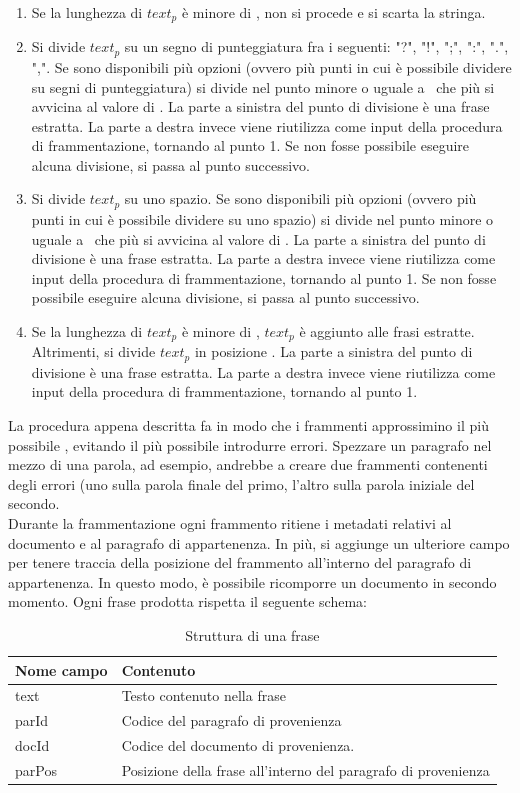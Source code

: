 \begin{enumerate}
\item Se la lunghezza di $text_p$ è minore di \lmin, non si procede e si scarta la stringa.
\item Si divide $text_p$ su un segno di punteggiatura fra i seguenti: "?", "!", ";", ":", ".", ",". Se sono disponibili più opzioni (ovvero più punti in cui è possibile dividere su segni di punteggiatura) si divide nel punto minore o uguale a \lmax\ che più si avvicina al valore di \lmax. La parte a sinistra del punto di divisione è una frase estratta. La parte a destra invece viene riutilizza come input della procedura di frammentazione, tornando al punto 1. Se non fosse possibile eseguire alcuna divisione, si passa al punto successivo.
\item Si divide $text_p$ su uno spazio. Se sono disponibili più opzioni (ovvero più punti in cui è possibile dividere su uno spazio) si divide nel punto minore o uguale a \lmax\ che più si avvicina al valore di \lmax. La parte a sinistra del punto di divisione è una frase estratta. La parte a destra invece viene riutilizza come input della procedura di frammentazione, tornando al punto 1. Se non fosse possibile eseguire alcuna divisione, si passa al punto successivo.
\item Se la lunghezza di $text_p$ è minore di \lmax, $text_p$ è aggiunto alle frasi estratte. Altrimenti, si divide $text_p$ in posizione \lmax. La parte a sinistra del punto di divisione è una frase estratta. La parte a destra invece viene riutilizza come input della procedura di frammentazione, tornando al punto 1. 
\end{enumerate}

La procedura appena descritta fa in modo che i frammenti approssimino il più possibile \lmax, evitando il più possibile introdurre errori. Spezzare un paragrafo nel mezzo di una parola, ad esempio, andrebbe a creare due frammenti contenenti degli errori (uno sulla parola finale del primo, l'altro sulla parola iniziale del secondo.\\
Durante la frammentazione ogni frammento ritiene i metadati relativi al documento e al paragrafo di appartenenza. In più, si aggiunge un ulteriore campo per tenere traccia della posizione del frammento all'interno del paragrafo di appartenenza. In questo modo, è possibile ricomporre un documento in secondo momento. Ogni frase prodotta rispetta il seguente schema:
\begin{table}[H]
\centering
\begin{tabular}{ll}
\textbf{Nome campo} & \textbf{Contenuto} \\ \hline
text  & Testo contenuto nella frase\\
parId & Codice del paragrafo di provenienza \\
docId & Codice del documento di provenienza.\\
parPos & Posizione della frase all'interno del paragrafo di provenienza\\
\end{tabular}
\caption{Struttura di una frase}
\label{tab:dst_frasestrut}
\end{table}

